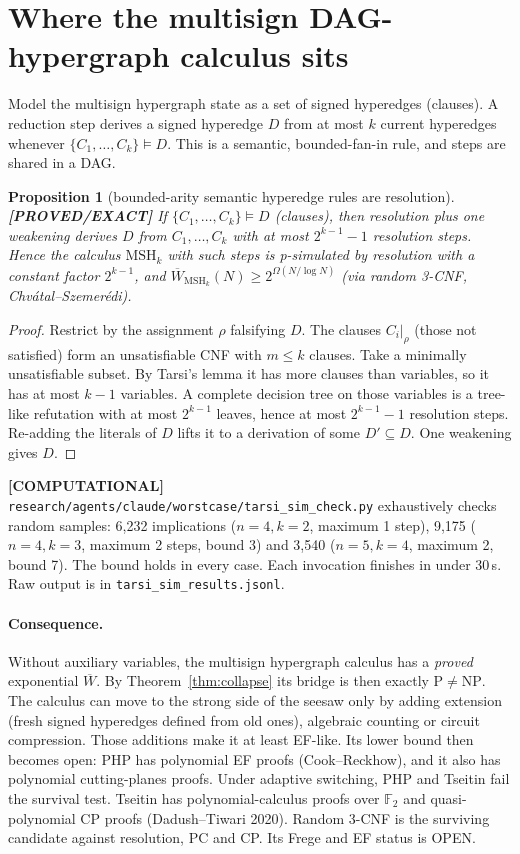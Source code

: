 \documentclass[11pt]{article}
\newtheorem{proposition}[theorem]{Proposition}
\theoremstyle{definition}
\theoremstyle{remark}
\newcommand{\Wb}{\overline W}
\newcommand{\status}[1]{\textbf{[#1]}}
\begin{document}
\section{Where the multisign DAG-hypergraph calculus sits}

Model the multisign hypergraph state as a set of signed hyperedges (clauses). A reduction step derives a
signed hyperedge $D$ from at most $k$ current hyperedges whenever $\{C_1,\dots,C_k\}\models D$. This is a
semantic, bounded-fan-in rule, and steps are shared in a DAG.

\begin{proposition}[bounded-arity semantic hyperedge rules are resolution]\label{prop:tarsi}
\status{PROVED/EXACT} If $\{C_1,\dots,C_k\}\models D$ (clauses), then resolution plus one weakening derives
$D$ from $C_1,\dots,C_k$ with at most $2^{k-1}-1$ resolution steps. Hence the calculus $\mathrm{MSH}_k$ with
such steps is p-simulated by resolution with a constant factor $2^{k-1}$, and
$\Wb_{\mathrm{MSH}_k}(N)\ge 2^{\Omega(N/\log N)}$ (via random 3-CNF, Chv\'atal--Szemer\'edi).
\end{proposition}
\begin{proof}
Restrict by the assignment $\rho$ falsifying $D$. The clauses $C_i|_\rho$ (those not satisfied) form an
unsatisfiable CNF with $m\le k$ clauses. Take a minimally unsatisfiable subset. By Tarsi's lemma it has more
clauses than variables, so it has at most $k-1$ variables. A complete decision tree on those variables is a
tree-like refutation with at most $2^{k-1}$ leaves, hence at most $2^{k-1}-1$ resolution steps. Re-adding
the literals of $D$ lifts it to a derivation of some $D'\subseteq D$. One weakening gives $D$.
\end{proof}

\status{COMPUTATIONAL} \texttt{research/agents/claude/worstcase/tarsi\_sim\_check.py} exhaustively checks
random samples: 6{,}232 implications ($n=4,k=2$, maximum 1 step), 9{,}175 ($n=4,k=3$, maximum 2 steps,
bound 3) and 3{,}540 ($n=5,k=4$, maximum 2, bound 7). The bound holds in every case. Each invocation finishes
in under 30\,s. Raw output is in \texttt{tarsi\_sim\_results.jsonl}.

\paragraph{Consequence.} Without auxiliary variables, the multisign hypergraph calculus has a
\emph{proved} exponential $\Wb$. By Theorem~\ref{thm:collapse} its bridge is then exactly $\mathrm P\ne\mathrm{NP}$.
The calculus can move to the strong side of the seesaw only by adding extension (fresh signed hyperedges
defined from old ones), algebraic counting or circuit compression. Those additions make it at least
EF-like. Its lower bound then becomes open: PHP has polynomial EF proofs (Cook--Reckhow), and it also has
polynomial cutting-planes proofs. Under adaptive switching, PHP and Tseitin fail the survival test.
Tseitin has polynomial-calculus proofs over $\mathbb F_2$ and quasi-polynomial CP proofs
(Dadush--Tiwari 2020). Random 3-CNF is the surviving candidate against resolution, PC and CP. Its Frege and
EF status is OPEN.
\end{document}
